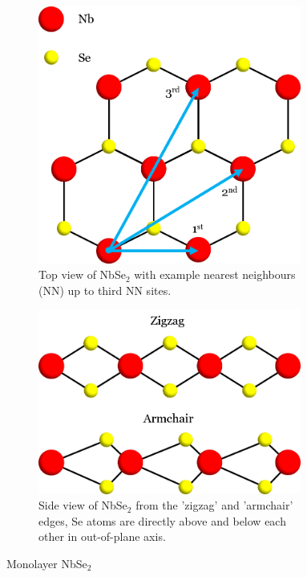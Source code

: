 \documentclass[12pt]{report} %
\begin{document}
\begin{figure}[t]
\centering
  \begin{subfigure}[c]{0.475\textwidth}
    \centering
    \includegraphics[width=0.95\textwidth]{NbSe_top.png}
    \caption{
      Top view of NbSe$_2$ with example nearest neighbours (NN) up to third NN sites.
    }
  \end{subfigure}
  \hfill
  \begin{subfigure}[c]{0.475\textwidth}
    \centering
    \includegraphics[width=0.95\textwidth]{NbSe_side.png}
    \begin{minipage}{.1cm}
      \vfill
    \end{minipage}
    \caption{
      Side view of NbSe$_2$ from the 'zigzag' and 'armchair' edges, Se atoms are directly above and below each other in out-of-plane axis.
    }
  \end{subfigure}
  \caption{
    Monolayer NbSe$_2$
  }
\end{figure}
\end{document}
